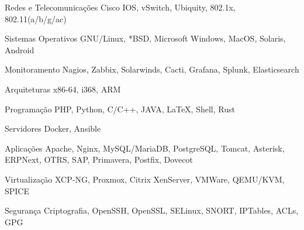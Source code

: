 


\begin{cvskills}

\cvskill
{Redes e Telecomunicações} %
{Cisco IOS, vSwitch, Ubiquity, 802.1x, 802.11(a/b/g/ac)} %


\cvskill
{Sistemas Operativos} %
{GNU/Linux, *BSD, Microsoft Windows, MacOS, Solaris, Android} %


\cvskill
{Monitoramento} %
{Nagios, Zabbix, Solarwinds, Cacti, Grafana, Splunk, Elasticsearch} %


\cvskill
{Arquiteturas} %
{x86-64, i368, ARM} %



\cvskill
{Programação} %
{PHP, Python, C/C++, JAVA, LaTeX, Shell, Rust} %


\cvskill
{Servidores} %
{Docker, Ansible} %


\cvskill
{Aplicações} %
{Apache, Nginx, MySQL/MariaDB, PostgreSQL, Tomcat, Asterisk, ERPNext, OTRS, SAP, Primavera, Postfix, Dovecot} %


\cvskill
{Virtualização} %
{XCP-NG, Proxmox, Citrix XenServer, VMWare, QEMU/KVM, SPICE} %


\cvskill
{Segurança} %
{Criptografia, OpenSSH, OpenSSL, SELinux, SNORT, IPTables, ACLs, GPG} %


\end{cvskills}
